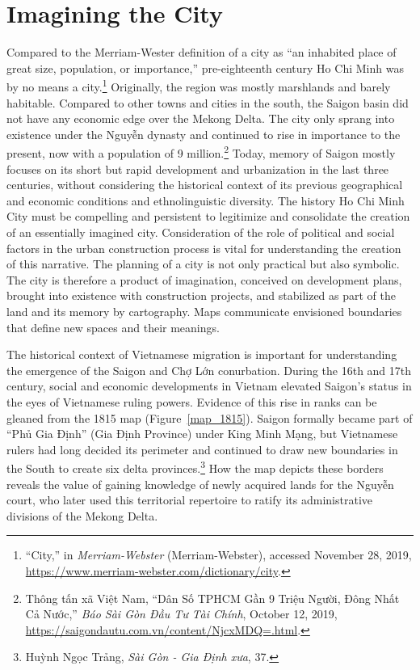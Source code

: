 \section{Imagining the City}
Compared to the Merriam-Wester definition of a city as “an inhabited place of great size, population, or importance,” pre-eighteenth century Ho Chi Minh was by no means a city.\footnote{“City,” in \textit{Merriam-Webster} (Merriam-Webster), accessed November 28, 2019, \url{https://www.merriam-webster.com/dictionary/city}.} Originally, the region was mostly marshlands and barely habitable. Compared to other towns and cities in the south, the Saigon basin did not have any economic edge over the Mekong Delta. The city only sprang into existence under the Nguyễn dynasty and continued to rise in importance to the present, now with a population of 9 million.\footnote{Thông tấn xã Việt Nam, “Dân Số TPHCM Gần 9 Triệu Người, Đông Nhất Cả Nước,” \textit{Báo Sài Gòn Đầu Tư Tài Chính}, October 12, 2019, \url{https://saigondautu.com.vn/content/NjcxMDQ=.html}.} Today, memory of Saigon mostly focuses on its short but rapid development and urbanization in the last three centuries, without considering the historical context of its previous geographical and economic conditions and ethnolinguistic diversity. The history Ho Chi Minh City must be compelling and persistent to legitimize and consolidate the creation of an essentially imagined city. Consideration of the role of political and social factors in the urban construction process is vital for understanding the creation of this narrative. The planning of a city is not only practical but also symbolic. The city is therefore a product of imagination, conceived on development plans, brought into existence with construction projects, and stabilized as part of the land and its memory by cartography. Maps communicate envisioned boundaries that define new spaces and their meanings.

The historical context of Vietnamese migration is important for understanding the emergence of the Saigon and Chợ Lớn conurbation. During the 16th and 17th century, social and economic developments in Vietnam elevated Saigon’s status in the eyes of Vietnamese ruling powers. Evidence of this rise in ranks can be gleaned from the 1815 map (Figure~\ref{map_1815}). Saigon formally became part of “Phủ Gia Định” (Gia Định Province) under King Minh Mạng, but Vietnamese rulers had long decided its perimeter and continued to draw new boundaries in the South to create six delta provinces.\footnote{Huỳnh Ngọc Trảng, \textit{Sài Gòn - Gia Định xưa}, 37.} How the map depicts these borders reveals the value of gaining knowledge of newly acquired lands for the Nguyễn court, who later used this territorial repertoire to ratify its administrative divisions of the Mekong Delta.

